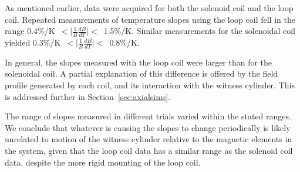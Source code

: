 


As mentioned earlier, data were acquired for both the solenoid coil
and the loop coil.  Repeated measurements of temperature slopes using
the loop coil fell in the range
0.4\%/K~$<\vert\frac{1}{B}\frac{dB}{dT}\vert<$~1.5\%/K.
Similar measurements for the solenoidal coil yielded
0.3\%/K~$<\vert\frac{1}{B}\frac{dB}{dT}\vert<$~0.8\%/K.

In general, the slopes measured with the loop coil were larger than for
the solenoidal coil.  A partial explanation of this difference is
offered by the field profile generated by each coil, and its
interaction with the witness cylinder.  This is addressed further in
Section~\ref{sec:axialsims}.

The range of slopes measured in different trials varied within the
stated ranges.  We conclude that whatever is causing the slopes to
change periodically is likely unrelated to motion of the witness
cylinder relative to the magnetic elements in the system, given that
the loop coil data has a similar range as the solenoid coil data,
despite the more rigid mounting of the loop coil.


